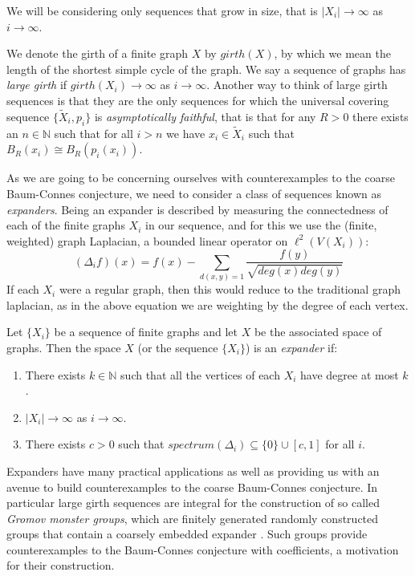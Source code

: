 \begin{conjecture}
{We will be considering only sequences that grow in size, that is $\vert X_{i} \vert \rightarrow \infty$ as $i \rightarrow \infty$. 

We denote the girth of a finite graph $X$ by $girth(X)$, by which we mean the length of the shortest simple cycle of the graph. We say a sequence of graphs has \textit{large girth} if $girth(X_{i})\rightarrow \infty$ as $i\rightarrow \infty$. Another way to think of large girth sequences is that they are the only sequences for which the universal covering sequence $\lbrace \tilde{X}_{i}, p_{i} \rbrace$ is \textit{asymptotically faithful}, that is that for any $R>0$ there exists an $n \in \mathbb{N}$ such that for all $i > n$ we have $x_{i} \in \tilde{X}_{i}$ such that $B_{R}(x_{i}) \cong B_{R}(p_{i}(x_{i}))$.

As we are going to be concerning ourselves with counterexamples to the coarse Baum-Connes conjecture, we need to consider a class of sequences known as \textit{expanders}. Being an expander is described by measuring the connectedness of each of the finite graphs $X_{i}$ in our sequence, and for this we use the (finite, weighted) graph Laplacian, a bounded linear operator on $\ell^{2}(V(X_{i}))$:
\begin{equation*}
(\Delta_{i}f)(x)= f(x) - \sum_{d(x,y)=1}\frac{f(y)}{\sqrt{deg(x)deg(y)}}
\end{equation*}
If each $X_{i}$ were a regular graph, then this would reduce to the traditional graph laplacian, as in the above equation we are weighting by the degree of each vertex.

\begin{definition}
Let $\lbrace X_{i} \rbrace$ be a sequence of finite graphs and let $X$ be the associated space of graphs. Then the space $X$ (or the sequence $\lbrace X_{i} \rbrace$) is an \textit{expander} if:
\begin{enumerate}
\item There exists $k\in \mathbb{N}$ such that all the vertices of each $X_{i}$ have degree at most $k$.
\item $\vert X_{i} \vert \rightarrow \infty$ as $i\rightarrow \infty$.
\item There exists $c>0$ such that $spectrum(\Delta_{i})\subseteq \lbrace 0 \rbrace \cup [c,1]$ for all $i$.
\end{enumerate}
\end{definition}

Expanders have many practical applications as well as providing us with an avenue to build counterexamples to the coarse Baum-Connes conjecture. In particular large girth sequences are integral for the construction of so called \textit{Gromov monster groups}, which are finitely generated randomly constructed groups that contain a coarsely embedded expander \cite{MR1978492,exrangrps}. Such groups provide counterexamples to the Baum-Connes conjecture with coefficients, a motivation for their construction.

}
\end{conjecture}
